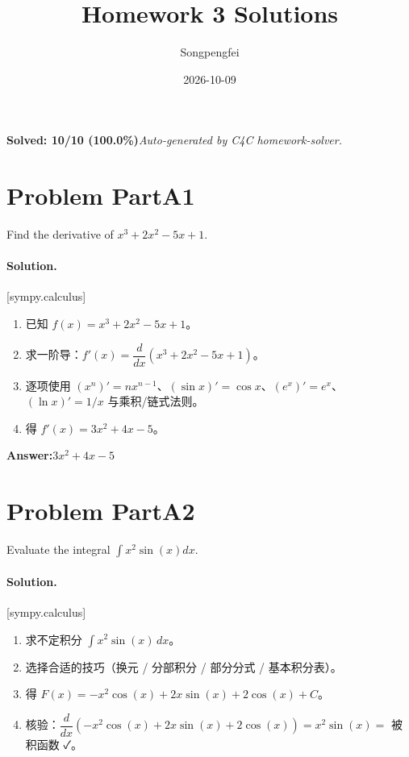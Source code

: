 \documentclass[11pt,a4paper]{ctexart}
\title{Homework 3 Solutions}
\author{Songpengfei}
\date{2026-10-09}
\newcommand{\solvertag}[1]{{\footnotesize\color{gray}\textsf{[#1]}}}
\begin{document}
\maketitle

\noindent\textbf{Solved: 10/10 (100.0\%)}\quad\textit{Auto-generated by C4C homework-solver.}

\section*{Problem PartA1}
Find the derivative of $x^3 + 2x^2 - 5x + 1$.

\paragraph{Solution.} \solvertag{sympy.calculus} 

\begin{enumerate}[leftmargin=*]
  \item 已知 $f(x) = x^{3} + 2 x^{2} - 5 x + 1$。
  \item 求一阶导：$f'(x) = \dfrac{d}{dx}\left(x^{3} + 2 x^{2} - 5 x + 1\right)$。
  \item 逐项使用 $(x^n)' = nx^{n-1}$、$(\sin x)' = \cos x$、$(e^x)' = e^x$、$(\ln x)' = 1/x$ 与乘积/链式法则。
  \item 得 $f'(x) = 3 x^{2} + 4 x - 5$。
\end{enumerate}

\noindent\textbf{Answer:}\quad $3 x^{2} + 4 x - 5$

\medskip

\section*{Problem PartA2}
Evaluate the integral $\int x^2 \sin(x) dx$.

\paragraph{Solution.} \solvertag{sympy.calculus} 

\begin{enumerate}[leftmargin=*]
  \item 求不定积分 $\displaystyle\int x^{2} \sin{\left(x \right)}\, dx$。
  \item 选择合适的技巧（换元 / 分部积分 / 部分分式 / 基本积分表）。
  \item 得 $F(x) = - x^{2} \cos{\left(x \right)} + 2 x \sin{\left(x \right)} + 2 \cos{\left(x \right)} + C$。
  \item 核验：$\dfrac{d}{dx}\left(- x^{2} \cos{\left(x \right)} + 2 x \sin{\left(x \right)} + 2 \cos{\left(x \right)}\right) = x^{2} \sin{\left(x \right)} = $ 被积函数 ✓。
\end{enumerate}
\end{document}
